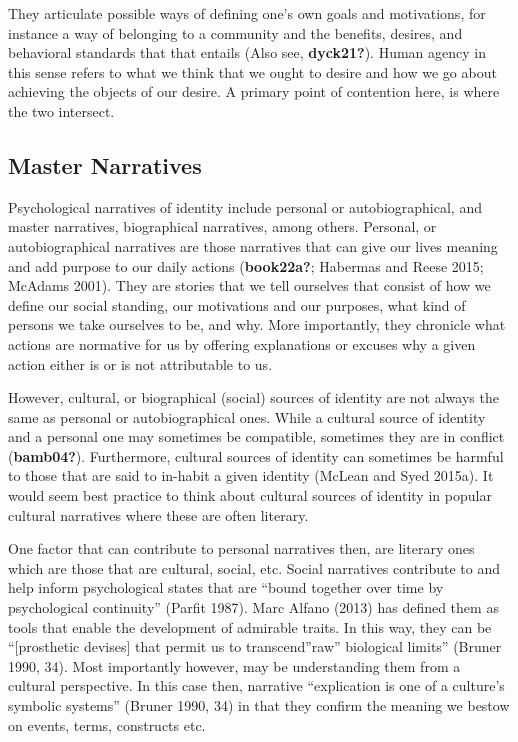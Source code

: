 \documentclass[12pt]{book}
\theoremstyle{definition}
\theoremstyle{remark}
\begin{document}
They articulate possible ways of defining one's own goals and motivations, for instance a way of belonging to a community and the benefits, desires, and behavioral standards that that entails (Also see, \textbf{dyck21?}). Human agency in this sense refers to what we think that we ought to desire and how we go about achieving the objects of our desire. A primary point of contention here, is where the two intersect.

\subsection*{Master Narratives}\label{master-narratives}

Psychological narratives of identity include personal or autobiographical, and master narratives, biographical narratives, among others. Personal, or autobiographical narratives are those narratives that can give our lives meaning and add purpose to our daily actions (\textbf{book22a?}; Habermas and Reese 2015; McAdams 2001). They are stories that we tell ourselves that consist of how we define our social standing, our motivations and our purposes, what kind of persons we take ourselves to be, and why. More importantly, they chronicle what actions are normative for us by offering explanations or excuses why a given action either is or is not attributable to us.

However, cultural, or biographical (social) sources of identity are not always the same as personal or autobiographical ones. While a cultural source of identity and a personal one may sometimes be compatible, sometimes they are in conflict (\textbf{bamb04?}). Furthermore, cultural sources of identity can sometimes be harmful to those that are said to in-habit a given identity (McLean and Syed 2015a). It would seem best practice to think about cultural sources of identity in popular cultural narratives where these are often literary.

One factor that can contribute to personal narratives then, are literary ones which are those that are cultural, social, etc. Social narratives contribute to and help inform psychological states that are ``bound together over time by psychological continuity'' (Parfit 1987). Marc Alfano (2013) has defined them as tools that enable the development of admirable traits. In this way, they can be ``{[}prosthetic devises{]} that permit us to transcend''raw'' biological limits'' (Bruner 1990, 34). Most importantly however, may be understanding them from a cultural perspective. In this case then, narrative ``explication is one of a culture's symbolic systems'' (Bruner 1990, 34) in that they confirm the meaning we bestow on events, terms, constructs etc.
\end{document}
